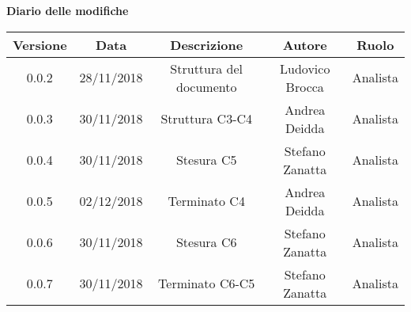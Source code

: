 \begin{center}
		\textbf{Diario delle modifiche}
	\end{center}
	\begin{center}
		\begin{tabular}{|c|c|c|c|c|}
			\hline
			\textbf{Versione} & \textbf{Data} & \textbf{Descrizione} & \textbf{Autore} & \textbf{Ruolo} \\
			\hline 
			0.0.2 & 28/11/2018 & Struttura del documento & Ludovico Brocca & Analista\\
			\hline
			0.0.3 & 30/11/2018 & Struttura C3-C4 & Andrea Deidda & Analista \\
			\hline
			0.0.4 & 30/11/2018 & Stesura C5 & Stefano Zanatta & Analista \\
			\hline
			0.0.5 & 02/12/2018 & Terminato C4 & Andrea Deidda & Analista \\
			\hline
			0.0.6 & 30/11/2018 & Stesura C6 & Stefano Zanatta & Analista \\
			\hline
			0.0.7 & 30/11/2018 & Terminato C6-C5 & Stefano Zanatta & Analista \\
			\hline
		\end{tabular}
	\end{center}
\newpage